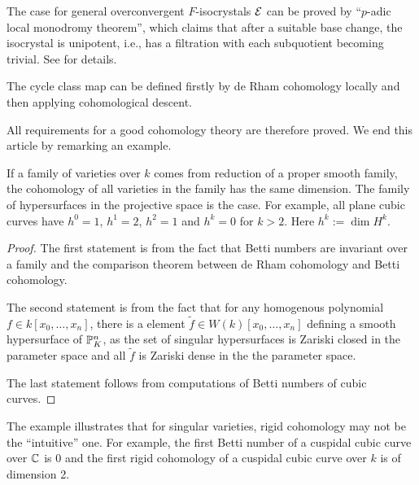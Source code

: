 \begin{remark}
    The case for general overconvergent $F$-isocrystals ${\mathcal {E}}$ 
    can be proved by ``$p$-adic local monodromy theorem'', 
    which claims that after a suitable base change, 
    the isocrystal is unipotent, i.e., 
    has a filtration with each subquotient becoming trivial. 
    See \cite{Ke1} for details.
\end{remark}

\begin{remark}
    The cycle class map can be defined 
    firstly by de Rham cohomology locally 
    and then applying cohomological descent.
\end{remark}

All requirements for a good cohomology theory are therefore proved. 
We end this article by remarking an example.
\begin{example}
    If a family of varieties over $k$ comes from reduction of a proper smooth family, 
    the cohomology of all varieties in the family has the same dimension. 
    The family of hypersurfaces in the projective space is the case. 
    For example, all plane cubic curves have 
    $h^0 = 1$, $h^1 = 2$, $h^2=1$ and $h^k = 0$ for $k > 2$. 
    Here $h^k := \dim H^k$.
\end{example}

\begin{proof}
    The first statement is from the fact that 
    Betti numbers are invariant over a family and 
    the comparison theorem between de Rham cohomology and Betti cohomology. 

    The second statement is from the fact that 
    for any homogenous polynomial $f\in k[x_0, \dots, x_n]$, 
    there is a element $\tilde{f} \in W(k)[x_0, \dots, x_n]$ 
    defining a smooth hypersurface of ${\mathbb {P}}_K^n$, 
    as the set of singular hypersurfaces is Zariski closed in the parameter space 
    and all $\tilde{f}$ is Zariski dense in the the parameter space.

    The last statement follows from computations of Betti numbers of cubic curves. 
\end{proof}

The example illustrates that for singular varieties, 
rigid cohomology may not be the ``intuitive'' one. 
For example, the first Betti number of a cuspidal cubic curve over ${\mathbb {C}}$ is $0$ 
and the first rigid cohomology of a cuspidal cubic curve over $k$ is of dimension 2. 